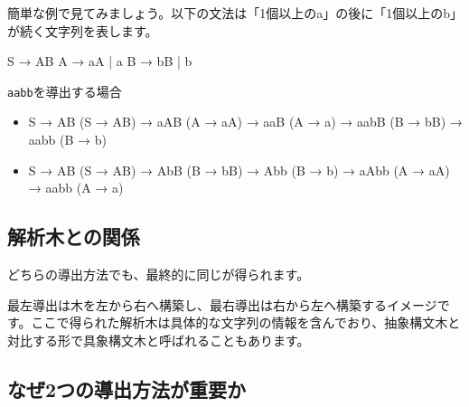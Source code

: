 簡単な例で見てみましょう。以下の文法は「1個以上のa」の後に「1個以上のb」が続く文字列を表します。

\begin{codescreen}{}
S → AB
A → aA | a
B → bB | b
\end{codescreen}

\texttt{aabb}を導出する場合

\begin{itemize}
\item
\begin{codescreen}{}
S  
→ AB      (S → AB)
→ aAB     (A → aA)  
→ aaB     (A → a)
→ aabB    (B → bB)
→ aabb    (B → b)
\end{codescreen}

\item
\begin{codescreen}{}
S
→ AB      (S → AB)
→ AbB     (B → bB)
→ Abb     (B → b)  
→ aAbb    (A → aA)
→ aabb    (A → a)
\end{codescreen}
\end{itemize}

\subsection{解析木との関係}

どちらの導出方法でも、最終的に同じが得られます。

\begin{center}
\end{center}

最左導出は木を左から右へ構築し、最右導出は右から左へ構築するイメージです。ここで得られた解析木は具体的な文字列の情報を含んでおり、抽象構文木と対比する形で具象構文木と呼ばれることもあります。

\subsection{なぜ2つの導出方法が重要か}

